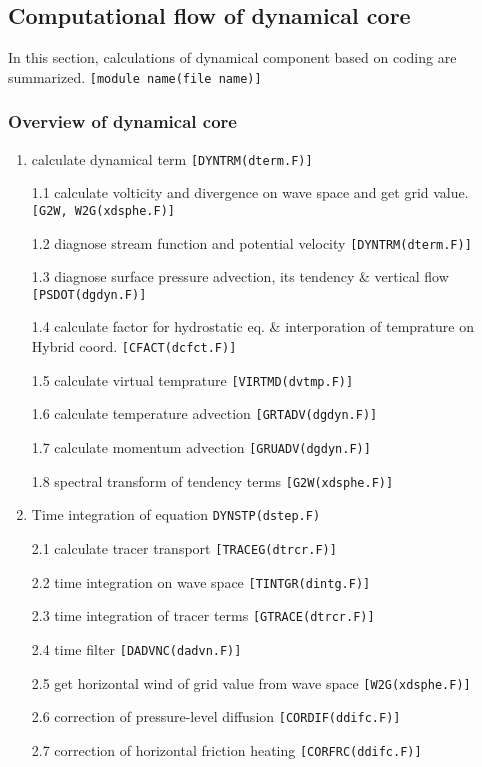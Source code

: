 \hypertarget{computational-flow-of-dynamical-core}{%
\subsection{Computational flow of dynamical
core}\label{computational-flow-of-dynamical-core}}

In this section, calculations of dynamical component based on coding are
summarized. \texttt{{[}module\ name(file\ name){]}}

\hypertarget{overview-of-dynamical-core}{%
\subsubsection{Overview of dynamical
core}\label{overview-of-dynamical-core}}

\begin{enumerate}
\def\labelenumi{\arabic{enumi}.}
\item
  calculate dynamical term \texttt{{[}DYNTRM(dterm.F){]}}

  1.1 calculate volticity and divergence on wave space and get grid
  value. \texttt{{[}G2W,\ W2G(xdsphe.F){]}}

  1.2 diagnose stream function and potential velocity
  \texttt{{[}DYNTRM(dterm.F){]}}

  1.3 diagnose surface pressure advection, its tendency \& vertical flow
  \texttt{{[}PSDOT(dgdyn.F){]}}

  1.4 calculate factor for hydrostatic eq. \& interporation of
  temprature on Hybrid coord. \texttt{{[}CFACT(dcfct.F){]}}

  1.5 calculate virtual temprature \texttt{{[}VIRTMD(dvtmp.F){]}}

  1.6 calculate temperature advection \texttt{{[}GRTADV(dgdyn.F){]}}

  1.7 calculate momentum advection \texttt{{[}GRUADV(dgdyn.F){]}}

  1.8 spectral transform of tendency terms \texttt{{[}G2W(xdsphe.F){]}}
\item
  Time integration of equation \texttt{DYNSTP(dstep.F)}

  2.1 calculate tracer transport \texttt{{[}TRACEG(dtrcr.F){]}}

  2.2 time integration on wave space \texttt{{[}TINTGR(dintg.F){]}}

  2.3 time integration of tracer terms \texttt{{[}GTRACE(dtrcr.F){]}}

  2.4 time filter \texttt{{[}DADVNC(dadvn.F){]}}

  2.5 get horizontal wind of grid value from wave space
  \texttt{{[}W2G(xdsphe.F){]}}

  2.6 correction of pressure-level diffusion
  \texttt{{[}CORDIF(ddifc.F){]}}

  2.7 correction of horizontal friction heating
  \texttt{{[}CORFRC(ddifc.F){]}}
\end{enumerate}

